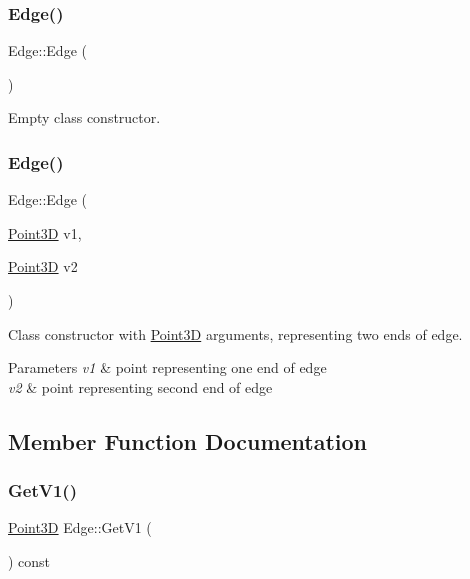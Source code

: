 \subsubsection{\texorpdfstring{Edge()}{Edge()}\hspace{0.1cm}{\footnotesize\ttfamily [1/2]}}
{\footnotesize\ttfamily Edge\+::\+Edge (\begin{DoxyParamCaption}{ }\end{DoxyParamCaption})}

Empty class constructor. \hypertarget{class_edge_a7011d5e767aad79a7c3798c297660a75}{}\label{class_edge_a7011d5e767aad79a7c3798c297660a75} 
\subsubsection{\texorpdfstring{Edge()}{Edge()}\hspace{0.1cm}{\footnotesize\ttfamily [2/2]}}
{\footnotesize\ttfamily Edge\+::\+Edge (\begin{DoxyParamCaption}\item[{\hyperlink{class_point3_d}{Point3D}}]{v1,  }\item[{\hyperlink{class_point3_d}{Point3D}}]{v2 }\end{DoxyParamCaption})}

Class constructor with \hyperlink{class_point3_d}{Point3D} arguments, representing two ends of edge. 
\begin{DoxyParams}{Parameters}
{\em v1} & point representing one end of edge \\
\hline
{\em v2} & point representing second end of edge \\
\hline
\end{DoxyParams}


\subsection{Member Function Documentation}
\hypertarget{class_edge_a770284695e38a15103cc04ef4e3a2ff9}{}\label{class_edge_a770284695e38a15103cc04ef4e3a2ff9} 
\subsubsection{\texorpdfstring{Get\+V1()}{GetV1()}}
{\footnotesize\ttfamily \hyperlink{class_point3_d}{Point3D} Edge\+::\+Get\+V1 (\begin{DoxyParamCaption}{ }\end{DoxyParamCaption}) const}

